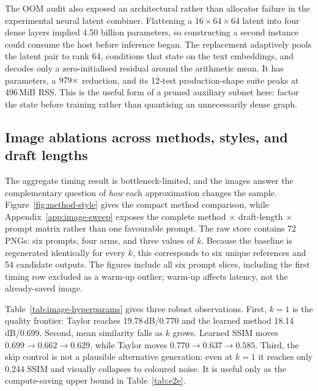 \documentclass[11pt,a4paper]{article}
\begin{document}
The OOM audit also exposed an architectural rather than allocator failure in
the experimental neural latent combiner. Flattening a $16\times64\times64$
latent into four dense layers implied 4.50 billion parameters, so constructing
a second instance could consume the host before inference began. The replacement
adaptively pools the latent pair to rank 64, conditions that state on the text
embeddings, and decodes only a zero-initialised residual around the arithmetic
mean. It has \CombinerParameters{} parameters, a
$979\times$ reduction, and its 12-test production-shape
suite peaks at 496\,MiB RSS. This is the useful form of a pruned auxiliary
subnet here: factor the state before training rather than quantising an
unnecessarily dense graph.

\subsection{Image ablations across methods, styles, and draft lengths}
\label{sec:image-ablations}

The aggregate timing result is bottleneck-limited, and the images answer the
complementary question of \emph{how} each approximation changes the sample.
Figure~\ref{fig:method-style} gives the compact method comparison, while
Appendix~\ref{app:image-sweep} exposes the complete method $\times$ draft-length
$\times$ prompt matrix rather than one favourable prompt. The raw store contains
72 PNGs: six prompts, four arms, and
three values of $k$. Because the baseline is regenerated identically for every
$k$, this corresponds to six unique references and 54 candidate outputs. The
figures include all six prompt slices, including the first timing row excluded
as a warm-up outlier; warm-up affects latency, not the already-saved image.

\begin{table}[H]
\centering
\small

\caption{Image hyperparameter ablation over all six prompts. Values are mean
PSNR (dB) and SSIM against the same-seed 16-step reference. Unlike
Table~\ref{tab:e2e}, no row is removed because this table contains no timing
measurement. Higher is better.}
\label{tab:image-hyperparams}
\end{table}

Table~\ref{tab:image-hyperparams} gives three robust observations. First,
$k=1$ is the quality frontier: Taylor reaches 19.78\,dB/0.770 and the learned
method 18.14\,dB/0.699. Second, mean similarity falls as $k$ grows. Learned
SSIM moves $0.699\rightarrow0.662\rightarrow0.629$, while Taylor moves
$0.770\rightarrow0.637\rightarrow0.585$. Third, the skip control is not a
plausible alternative generation: even at $k=1$ it reaches only 0.244 SSIM and
visually collapses to coloured noise. It is useful only as the compute-saving
upper bound in Table~\ref{tab:e2e}.
\end{document}
